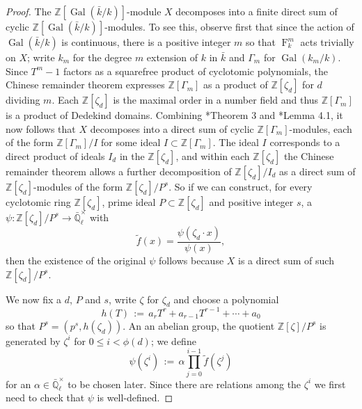 \documentclass[11pt]{amsart}
\theoremstyle{plain}
\theoremstyle{definition}
\theoremstyle{remark}
\newcommand{\ZZ}{{\mathbb{Z}}}
\newcommand{\EE}{\mathbb{\bar Q}_\ell}
\newcommand{\bFq}{\bar{k}}
\newcommand{\Fq}{k}
\newcommand{\Fqm}{k_m}
\newcommand{\EEx}{\EE^\times}
\DeclareMathOperator{\Gal}{Gal}
\newcommand{\Frob}[1]{\operatorname{F}_{#1}}
\newcommand{\ceq}{{\, :=\, }}
\begin{document}
\begin{proof}
  The $\ZZ[\Gal(\bFq/\Fq)]$-module $X$ decomposes into 
  a finite direct sum of cyclic $\ZZ[\Gal(\bFq/\Fq)]$-modules. 
  To see this, observe first that since the action of $\Gal(\bFq/\Fq)$ is continuous, 
  there is a positive integer $m$ so that $\Frob{\Fq}^m$ acts trivially on $X$; 
  write $\Fqm$ for the degree $m$ extension of $\Fq$ in $\bFq$ 
  and $\Gamma_m$ for $\Gal(\Fqm/\Fq)$.  Since
  $T^m-1$ factors as a squarefree product of cyclotomic polynomials,
  the Chinese remainder theorem expresses $\ZZ[\Gamma_m]$ as a product
  of $\ZZ[\zeta_d]$ for $d$ dividing $m$.  Each $\ZZ[\zeta_d]$ is the
  maximal order in a number field and thus $\ZZ[\Gamma_m]$ is a
  product of Dedekind domains. Combining \cite{Warfield:Decomposability}*{Theorem 3}
  and \cite{brandal:CommRingsFGModDecompose}*{Lemma 4.1}, it now follows that 
  $X$ decomposes into a direct sum of cyclic $\ZZ[\Gamma_m]$-modules, 
  each of the form $\ZZ[\Gamma_m] / I$ for some ideal $I \subset \ZZ[\Gamma_m]$.
  The ideal $I$ corresponds to a direct product of ideals $I_d$ in the
  $\ZZ[\zeta_d]$, and within each $\ZZ[\zeta_d]$ the Chinese remainder
  theorem allows a further decomposition of $\ZZ[\zeta_d] / I_d$ as a
  direct sum of $\ZZ[\zeta_d]$-modules of the form $\ZZ[\zeta_d]/P^s$.
  So if we can construct, for every cyclotomic ring $\ZZ[\zeta_d]$,
  prime ideal $P \subset \ZZ[\zeta_d]$ and positive integer $s$, a
  $\psi \colon \ZZ[\zeta_d]/P^s \rightarrow \EEx$ with
  \begin{equation} \label{eq:psi-condition}
    \tilde{f}(x) = \frac{\psi(\zeta_d \cdot x)}{\psi(x)},
  \end{equation}
  then the existence of the original $\psi$ follows because $X$ is a
  direct sum of such $\ZZ[\zeta_d]/P^s$.

  We now fix a $d$, $P$ and $s$, write $\zeta$ for $\zeta_d$ and
  choose a polynomial
  \[
  h(T) \ceq a_rT^r + a_{r-1}T^{r-1} + \cdots + a_0
  \]
  so that $P^s = (p^s, h(\zeta_d))$.
  An an abelian group, the quotient $\ZZ[\zeta] / P^s$ is generated by
  $\zeta^i$ for $0 \le i < \phi(d)$; we define
  \begin{equation} \label{eq:psi-def}
    \psi(\zeta^i) \ceq \alpha \prod_{j=0}^{i-1} \tilde{f}(\zeta^j)
  \end{equation}
  for an $\alpha \in \EEx$ to be chosen later.  Since there are
  relations among the $\zeta^i$ we first need to check that $\psi$ is
  well-defined.


\end{proof}
\end{document}
